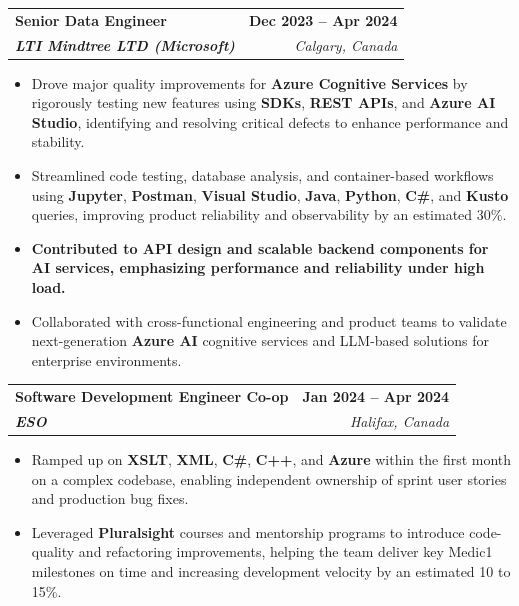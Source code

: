 \documentclass[letterpaper,11pt]{article}
\makeatletter
\newcommand{\resumeItem}[1]{
  \item\small{
    {#1 \vspace{-2pt}}
  }
}
\newcommand{\resumeSubheading}[4]{
  \vspace{-2pt}\item
    \begin{tabular*}{1.0\textwidth}[t]{l@{\extracolsep{\fill}}r}
      \textbf{#1} & \textbf{\small #2} \\
      \textit{\small#3} & \textit{\small #4} \\
    \end{tabular*}\vspace{-7pt}
}
\newcommand{\resumeItemListStart}{\begin{itemize}}
\newcommand{\resumeItemListEnd}{\end{itemize}\vspace{-5pt}}
\makeatother
\begin{document}
    \resumeSubheading
      {\textbf{Senior Data Engineer}}{\textbf{Dec 2023 -- Apr 2024}}
      {\textbf{LTI Mindtree LTD (Microsoft)}}{Calgary, Canada}
      \resumeItemListStart
        \resumeItem{Drove major quality improvements for \textbf{Azure Cognitive Services} by rigorously testing new features using \textbf{SDKs}, \textbf{REST APIs}, and \textbf{Azure AI Studio}, identifying and resolving critical defects to enhance performance and stability.}
        \resumeItem{Streamlined code testing, database analysis, and container-based workflows using \textbf{Jupyter}, \textbf{Postman}, \textbf{Visual Studio}, \textbf{Java}, \textbf{Python}, \textbf{C\#}, and \textbf{Kusto} queries, improving product reliability and observability by an estimated 30\%.}
        \resumeItem{\textbf{Contributed to API design and scalable backend components for AI services, emphasizing performance and reliability under high load.}}
        \resumeItem{Collaborated with cross-functional engineering and product teams to validate next-generation \textbf{Azure AI} cognitive services and LLM-based solutions for enterprise environments.}
      \resumeItemListEnd
    
    \resumeSubheading
      {\textbf{Software Development Engineer Co-op}}{\textbf{Jan 2024 -- Apr 2024}}
      {\textbf{ESO}}{Halifax, Canada}
      \resumeItemListStart
        \resumeItem{Ramped up on \textbf{XSLT}, \textbf{XML}, \textbf{C\#}, \textbf{C++}, and \textbf{Azure} within the first month on a complex codebase, enabling independent ownership of sprint user stories and production bug fixes.}
        \resumeItem{Leveraged \textbf{Pluralsight} courses and mentorship programs to introduce code-quality and refactoring improvements, helping the team deliver key Medic1 milestones on time and increasing development velocity by an estimated 10 to 15\%.}
      \resumeItemListEnd
\end{document}
